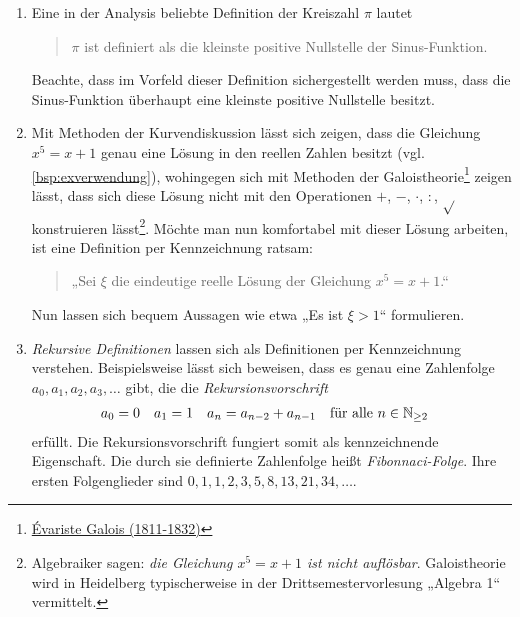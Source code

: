 \begin{bsp} \label{zeichendefinieren} \quad
    \begin{enumerate}
        \item Eine in der Analysis beliebte Definition der Kreiszahl $\pi$ lautet
        \begin{quote}
            $\pi$ ist definiert als die kleinste positive Nullstelle der Sinus-Funktion.
        \end{quote}
        Beachte, dass im Vorfeld dieser Definition sichergestellt werden muss, dass die Sinus-Funktion überhaupt eine kleinste positive Nullstelle besitzt.
        \item Mit Methoden der Kurvendiskussion lässt sich zeigen, dass die Gleichung $x^5=x+1$ genau eine Lösung in den reellen Zahlen besitzt (vgl. \cref{bsp:exverwendung}), wohingegen sich mit Methoden der Galoistheorie\footnote{\href{https://de.wikipedia.org/wiki/\%C3\%89variste_Galois}{Évariste Galois (1811-1832)}} zeigen lässt, dass sich diese Lösung nicht mit den Operationen $+$, $-$, $\cdot$, $:$, $\sqrt{}$ konstruieren lässt\footnote{Algebraiker sagen: \emph{die Gleichung $x^5=x+1$ ist nicht auflösbar}. Galoistheorie wird in Heidelberg typischerweise in der Drittsemestervorlesung „Algebra 1“ vermittelt.}. Möchte man nun komfortabel mit dieser Lösung arbeiten, ist eine Definition per Kennzeichnung ratsam:
        \begin{quote}
            „Sei $\xi$ die eindeutige reelle Lösung der Gleichung $x^5=x+1$.“
        \end{quote}
        Nun lassen sich bequem Aussagen wie etwa „Es ist $\xi>1$“ formulieren.
        \item \emph{Rekursive Definitionen} lassen sich als Definitionen per Kennzeichnung verstehen. Beispielsweise lässt sich beweisen, dass es genau eine Zahlenfolge $a_0,a_1,a_2,a_3,\dots$ gibt, die die \emph{Rekursionsvorschrift}
        \begin{align*}
            a_0 & = 0 & a_1 & = 1 & a_n & = a_{n-2} + a_{n-1}  && \text{für alle}\ n\in \mathbb N_{\ge 2}
        \end{align*}
        erfüllt. Die Rekursionsvorschrift fungiert somit als kennzeichnende Eigenschaft. Die durch sie definierte Zahlenfolge heißt \emph{Fibonnaci-Folge}. Ihre ersten Folgenglieder sind $0,1,1,2,3,5,8,13,21,34,\dots$.
    \end{enumerate}
\end{bsp}


